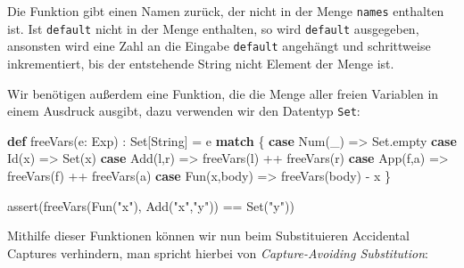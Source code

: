 \documentclass[]{article}
\newenvironment{Shaded}{}{}
\newcommand{\FunctionTok}[1]{\textcolor[rgb]{0.02,0.16,0.49}{#1}}
\newcommand{\KeywordTok}[1]{\textcolor[rgb]{0.00,0.44,0.13}{\textbf{#1}}}
\newcommand{\NormalTok}[1]{#1}
\newcommand{\StringTok}[1]{\textcolor[rgb]{0.25,0.44,0.63}{#1}}
\begin{document}
Die Funktion gibt einen Namen zurück, der nicht in der Menge
\texttt{names} enthalten ist. Ist \texttt{default} nicht in der Menge
enthalten, so wird \texttt{default} ausgegeben, ansonsten wird eine Zahl
an die Eingabe \texttt{default} angehängt und schrittweise
inkrementiert, bis der entstehende String nicht Element der Menge ist.

Wir benötigen außerdem eine Funktion, die die Menge aller freien
Variablen in einem Ausdruck ausgibt, dazu verwenden wir den Datentyp
\texttt{Set}:

\begin{Shaded}
\begin{Highlighting}[]
\KeywordTok{def} \FunctionTok{freeVars}\NormalTok{(e: Exp) : Set[String] = e }\KeywordTok{match}\NormalTok{ \{}
  \KeywordTok{case} \FunctionTok{Num}\NormalTok{(\_) =\textgreater{} Set.}\FunctionTok{empty}
  \KeywordTok{case} \FunctionTok{Id}\NormalTok{(x) =\textgreater{} Set(x)}
  \KeywordTok{case} \FunctionTok{Add}\NormalTok{(l,r) =\textgreater{} }\FunctionTok{freeVars}\NormalTok{(l) ++ }\FunctionTok{freeVars}\NormalTok{(r)}
  \KeywordTok{case} \FunctionTok{App}\NormalTok{(f,a) =\textgreater{} }\FunctionTok{freeVars}\NormalTok{(f) ++ }\FunctionTok{freeVars}\NormalTok{(a)}
  \KeywordTok{case} \FunctionTok{Fun}\NormalTok{(x,body) =\textgreater{} }\FunctionTok{freeVars}\NormalTok{(body) {-} x}
\NormalTok{\}}

\FunctionTok{assert}\NormalTok{(}\FunctionTok{freeVars}\NormalTok{(}\FunctionTok{Fun}\NormalTok{(}\StringTok{"x"}\NormalTok{), }\FunctionTok{Add}\NormalTok{(}\StringTok{"x"}\NormalTok{,}\StringTok{"y"}\NormalTok{)) == Set(}\StringTok{"y"}\NormalTok{))}
\end{Highlighting}
\end{Shaded}

Mithilfe dieser Funktionen können wir nun beim Substituieren Accidental
Captures verhindern, man spricht hierbei von \emph{Capture-Avoiding
Substitution}:
\end{document}

